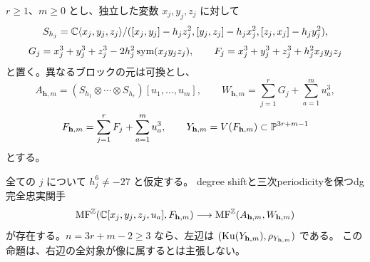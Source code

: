 \(r\ge1\)、\(m\ge0\) とし、独立した変数 \(x_j,y_j,z_j\) に対して
\[
 S_{h_j}=\mathbb C\langle x_j,y_j,z_j\rangle/
 ([x_j,y_j]-h_jz_j^2,[y_j,z_j]-h_jx_j^2,[z_j,x_j]-h_jy_j^2),
\]
\[
 G_j=x_j^3+y_j^3+z_j^3-2h_j^2\operatorname{sym}(x_jy_jz_j),\qquad
 F_j=x_j^3+y_j^3+z_j^3+h_j^2x_jy_jz_j
\]
と置く。異なるブロックの元は可換とし、
\[
 A_{\mathbf h,m}=(S_{h_1}\otimes\cdots\otimes S_{h_r})[u_1,\ldots,u_m],
 \qquad W_{\mathbf h,m}=\sum_{j=1}^rG_j+\sum_{a=1}^m u_a^3,
\]
\[
 F_{\mathbf h,m}=\sum_{j=1}^rF_j+\sum_{a=1}^m u_a^3,
 \qquad Y_{\mathbf h,m}=V(F_{\mathbf h,m})\subset\mathbb P^{3r+m-1}
\]
とする。

\begin{proposition}[多ブロックの完全忠実比較]\label{prop:multiblock-embedding}
 全ての \(j\) について \(h_j^6\ne-27\) と仮定する。
 degree shiftと三次periodicityを保つdg完全忠実関手
 \[
 \operatorname{MF}^{\mathbb Z}(\mathbb C[x_j,y_j,z_j,u_a],F_{\mathbf h,m})
 \longrightarrow
 \operatorname{MF}^{\mathbb Z}(A_{\mathbf h,m},W_{\mathbf h,m})
 \]
 が存在する。\(n=3r+m-2\ge3\) なら、左辺は
 \((\operatorname{Ku}(Y_{\mathbf h,m}),\rho_{Y_{\mathbf h,m}})\) である。
 この命題は、右辺の全対象が像に属するとは主張しない。
\end{proposition}
